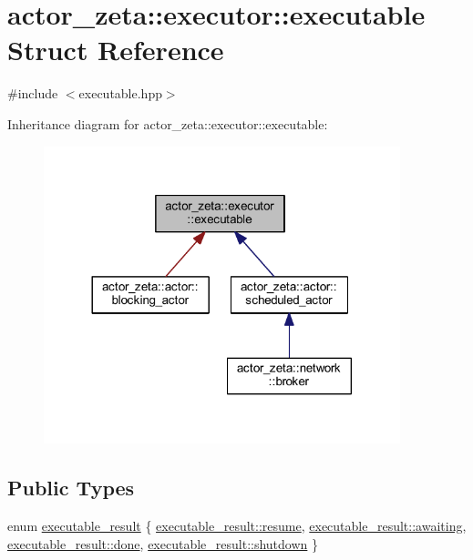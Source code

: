 \hypertarget{structactor__zeta_1_1executor_1_1executable}{}\section{actor\+\_\+zeta\+:\+:executor\+:\+:executable Struct Reference}
\label{structactor__zeta_1_1executor_1_1executable}


{\ttfamily \#include $<$executable.\+hpp$>$}



Inheritance diagram for actor\+\_\+zeta\+:\+:executor\+:\+:executable\+:\nopagebreak
\begin{figure}[H]
\begin{center}
\leavevmode
\includegraphics[width=293pt]{structactor__zeta_1_1executor_1_1executable__inherit__graph}
\end{center}
\end{figure}
\subsection*{Public Types}
\begin{DoxyCompactItemize}
\item 
enum \hyperlink{structactor__zeta_1_1executor_1_1executable_aef06c63be7b22b021ade4b83ed4f3cc4}{executable\+\_\+result} \{ \hyperlink{structactor__zeta_1_1executor_1_1executable_aef06c63be7b22b021ade4b83ed4f3cc4a69f2afc2390cec954f7c208b07212d39}{executable\+\_\+result\+::resume}, 
\hyperlink{structactor__zeta_1_1executor_1_1executable_aef06c63be7b22b021ade4b83ed4f3cc4a3ef2b55c41ed0d65d1e18c3ed461b5a7}{executable\+\_\+result\+::awaiting}, 
\hyperlink{structactor__zeta_1_1executor_1_1executable_aef06c63be7b22b021ade4b83ed4f3cc4a6b2ded51d81a4403d8a4bd25fa1e57ee}{executable\+\_\+result\+::done}, 
\hyperlink{structactor__zeta_1_1executor_1_1executable_aef06c63be7b22b021ade4b83ed4f3cc4a5924f03a95ee6f7277e5bdd1e81b8fdc}{executable\+\_\+result\+::shutdown}
 \}
\end{DoxyCompactItemize}
